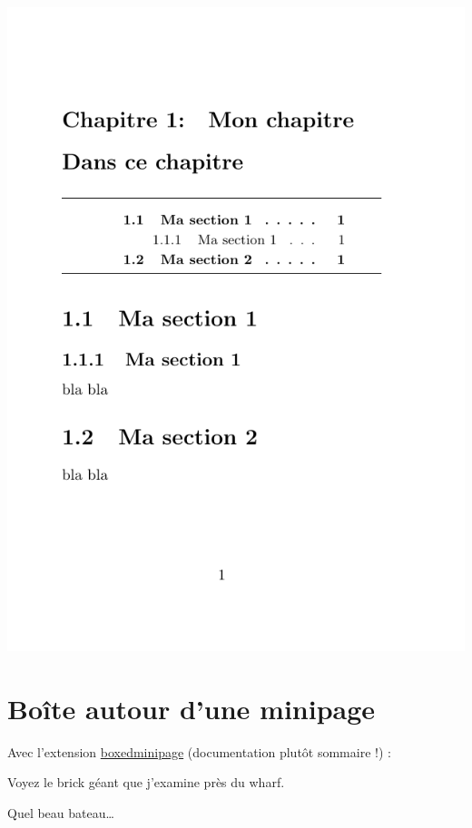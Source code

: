 \begin{boxedminipage}{.4\linewidth}
	\centering
	\includegraphics[scale=.5]{images/choix_extensions_exemple_minitoc}
\end{boxedminipage}





\section{Boîte autour d'une minipage}
Avec l'extension \href{http://mirror.ctan.org/macros/latex/contrib/boxedminipage/boxedminipage.pdf}{boxedminipage} (documentation plutôt sommaire !) :
\begin{LTXexample}[pos=o,width=.4]
\begin{boxedminipage}[t]{3cm}
    Voyez le brick géant que j'examine près du wharf.
\end{boxedminipage}
\begin{boxedminipage}[t]{3cm}
    Quel beau bateau\dots
\end{boxedminipage}
\end{LTXexample}





